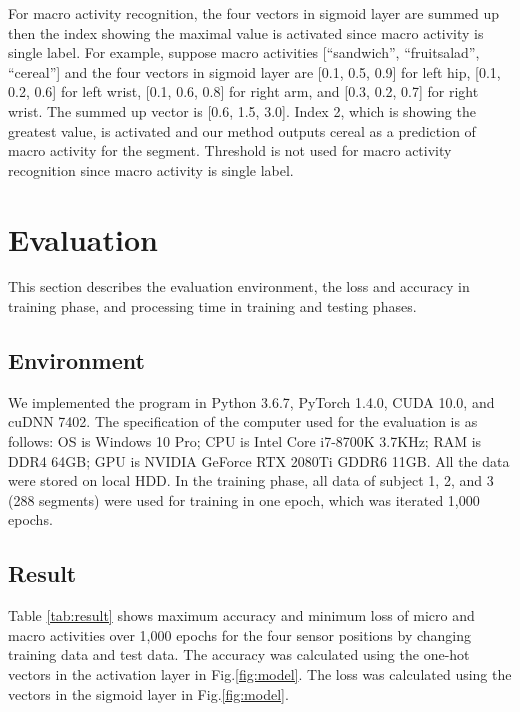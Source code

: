 \documentclass{svmult}
\begin{document}
For macro activity recognition, the four vectors in sigmoid layer are summed up then the index showing the maximal value is activated since macro activity is single label. For example, suppose macro activities [``sandwich'', ``fruitsalad'', ``cereal''] and the four vectors in sigmoid layer are [0.1, 0.5, 0.9] for left hip, [0.1, 0.2, 0.6] for left wrist, [0.1, 0.6, 0.8] for right arm, and [0.3, 0.2, 0.7] for right wrist. The summed up vector is [0.6, 1.5, 3.0]. Index 2, which is showing the greatest value, is activated and our method outputs cereal as a prediction of macro activity for the segment. Threshold is not used for macro activity recognition since macro activity is single label.

\section{Evaluation}
\label{sec:evaluation}
This section describes the evaluation environment, the loss and accuracy in training phase, and processing time in training and testing phases.

\subsection{Environment}
We implemented the program in Python 3.6.7, PyTorch 1.4.0, CUDA 10.0, and cuDNN 7402. The specification of the computer used for the evaluation is as follows: OS is Windows 10 Pro; CPU is Intel Core i7-8700K 3.7KHz; RAM is DDR4 64GB; GPU is NVIDIA GeForce RTX 2080Ti GDDR6 11GB.
All the data were stored on local HDD. In the training phase, all data of subject 1, 2, and 3 (288 segments) were used for training in one epoch, which was iterated 1,000 epochs.

\subsection{Result}
Table \ref{tab:result} shows maximum accuracy and minimum loss of micro and macro activities over 1,000 epochs for the four sensor positions by changing training data and test data. The accuracy was calculated using the one-hot vectors in the activation layer in Fig.\ref{fig:model}. The loss was calculated using the vectors in the sigmoid layer in Fig.\ref{fig:model}. 
\end{document}
